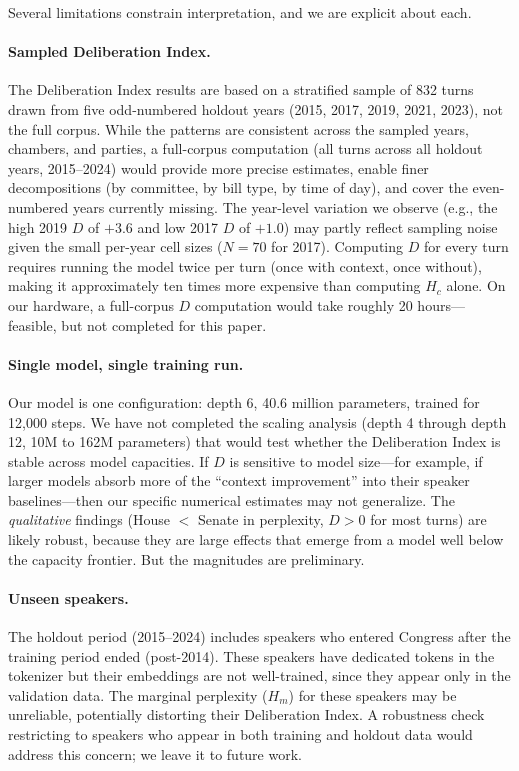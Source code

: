 \documentclass[12pt]{article}
\newcommand{\Hc}{H_c}
\newcommand{\Hm}{H_m}
\newcommand{\DI}{\mathit{D}}
\begin{document}
Several limitations constrain interpretation, and we are explicit about each.

\paragraph{Sampled Deliberation Index.} The Deliberation Index results are based on a stratified sample of 832 turns drawn from five odd-numbered holdout years (2015, 2017, 2019, 2021, 2023), not the full corpus. While the patterns are consistent across the sampled years, chambers, and parties, a full-corpus computation (all turns across all holdout years, 2015--2024) would provide more precise estimates, enable finer decompositions (by committee, by bill type, by time of day), and cover the even-numbered years currently missing. The year-level variation we observe (e.g., the high 2019 $\DI$ of $+3.6$ and low 2017 $\DI$ of $+1.0$) may partly reflect sampling noise given the small per-year cell sizes ($N = 70$ for 2017). Computing $\DI$ for every turn requires running the model twice per turn (once with context, once without), making it approximately ten times more expensive than computing $\Hc$ alone. On our hardware, a full-corpus $\DI$ computation would take roughly 20 hours---feasible, but not completed for this paper.

\paragraph{Single model, single training run.} Our model is one configuration: depth 6, 40.6 million parameters, trained for 12,000 steps. We have not completed the scaling analysis (depth 4 through depth 12, 10M to 162M parameters) that would test whether the Deliberation Index is stable across model capacities. If $\DI$ is sensitive to model size---for example, if larger models absorb more of the ``context improvement'' into their speaker baselines---then our specific numerical estimates may not generalize. The \textit{qualitative} findings (House $<$ Senate in perplexity, $\DI > 0$ for most turns) are likely robust, because they are large effects that emerge from a model well below the capacity frontier. But the magnitudes are preliminary.

\paragraph{Unseen speakers.} The holdout period (2015--2024) includes speakers who entered Congress after the training period ended (post-2014). These speakers have dedicated tokens in the tokenizer but their embeddings are not well-trained, since they appear only in the validation data. The marginal perplexity ($\Hm$) for these speakers may be unreliable, potentially distorting their Deliberation Index. A robustness check restricting to speakers who appear in both training and holdout data would address this concern; we leave it to future work.
\end{document}
